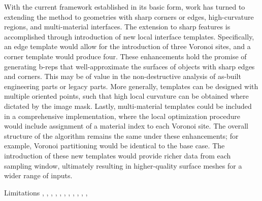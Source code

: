 With the current framework established in its basic form, work has turned to extending the method to geometries with sharp corners or edges, high-curvature regions, and multi-material interfaces. The extension to sharp features is accomplished through introduction of new local interface templates. Specifically, an edge template would allow for the introduction of three Voronoi sites, and a corner template would produce four. These enhancements hold the promise of generating b-reps that well-approximate the surfaces of objects with sharp edges and corners. This may be of value in the non-destructive analysis of as-built engineering parts or legacy parts. More generally, templates can be designed with multiple oriented points, such that high local curvature can be obtained where dictated by the image mask.  Lastly, multi-material templates could be included in a comprehensive implementation, where the local optimization procedure would include assignment of a material index to each Voronoi site. The overall structure of the algorithm remains the same under these enhancements; for example, Voronoi partitioning would be identical to the base case. The introduction of these new templates would provide richer data from each sampling window, ultimately resulting in higher-quality surface meshes for a wider range of inputs.

\color{purple}

Limitations
\cite{edelsbrunner1994}, \cite{coeurjolly2021}, \cite{fleishman2005}, \cite{brochu2010}, \cite{berge2019}, \cite{dey2003}, \cite{amenta2000}, \cite{dey2011}, \cite{boltcheva2017}, \cite{boltcheva2009}, \cite{kazhdan_2008}, \cite{kazhdan_2013}

\cite{levin2004}

\color{black}